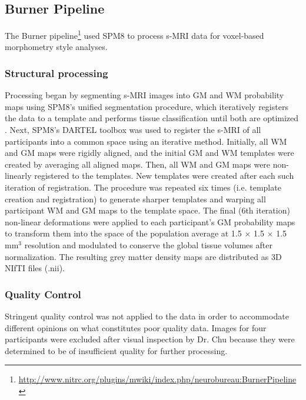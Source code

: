 \documentclass[preprint,12pt,3p]{elsarticle}
\begin{document}
\subsection{Burner Pipeline}

The Burner pipeline\footnote{\url{http://www.nitrc.org/plugins/mwiki/index.php/neurobureau:BurnerPipeline}} used SPM8 \cite{ashburner2012spm8} to process s-MRI data for voxel-based morphometry \cite{ashburner2000vbm} style analyses.

\subsubsection{Structural processing} 
Processing began by segmenting s-MRI images into GM and WM probability maps using SPM8's unified segmentation procedure, which iteratively registers the data to a template and performs tissue classification until both are optimized \cite{ashburner2005unified}. Next, SPM8's DARTEL toolbox \cite{ashburner2007dartel} was used to register the s-MRI of all participants into a common space using an iterative method. Initially, all WM and GM maps were rigidly aligned, and the initial GM and WM templates were created by averaging all aligned maps. Then, all WM and GM maps were non-linearly registered to the templates. New templates were created after each such iteration of registration. The procedure was repeated six times (i.e. template creation and registration) to generate sharper templates and warping all participant WM and GM maps to the template space. The final (6th iteration) non-linear deformations were applied to each participant's GM probability maps to transform them into the space of the population average at 1.5 $\times$ 1.5 $\times$ 1.5 mm$^3$ resolution and modulated to conserve the global tissue volumes after normalization. The resulting grey matter density maps are distributed as 3D NIfTI files (.nii).

\subsubsection{Quality Control}
Stringent quality control was not applied to the data in order to accommodate different opinions on what constitutes poor quality data. Images for four participants were excluded after visual inspection by Dr. Chu because they were determined to be of insufficient quality for further processing.
\end{document}
